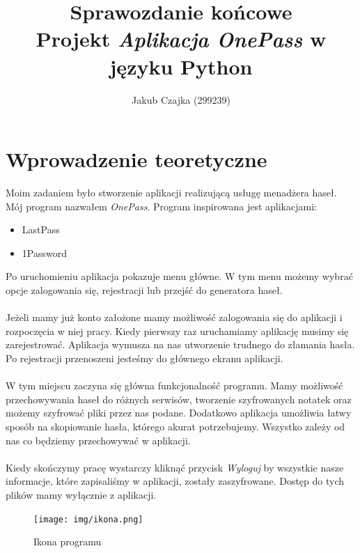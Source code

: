 \documentclass[a4paper]{article}
\title{Sprawozdanie końcowe \\ Projekt \textit{Aplikacja OnePass} w języku Python}
\author{Jakub Czajka (299239)}
\begin{document}
\maketitle
\tableofcontents
\thispagestyle{empty}
\newpage

\section{Wprowadzenie teoretyczne}
Moim zadaniem było stworzenie aplikacji realizującą usługę menadżera haseł. Mój program nazwałem \textit{OnePass}. Program inspirowana jest aplikacjami:
\begin{itemize}
    \item LastPass
    \item 1Password
\end{itemize}
Po uruchomieniu aplikacja pokazuje menu główne. W tym menu możemy wybrać opcje zalogowania się, rejestracji lub przejść do generatora haseł.\\ \\
Jeżeli mamy już konto założone mamy możliwość zalogowania się do aplikacji i rozpoczęcia w niej pracy. Kiedy pierwszy raz uruchamiamy aplikację musimy się zarejestrować. Aplikacja wymusza na nas utworzenie trudnego do złamania hasła. Po rejestracji przenoszeni jesteśmy do głównego ekranu aplikacji.\\ \\
W tym miejscu zaczyna się główna funkcjonalność programu. Mamy możliwość przechowywania haseł do różnych serwisów, tworzenie szyfrowanych notatek oraz możemy szyfrować pliki przez nas podane. Dodatkowo aplikacja umożliwia łatwy sposób na skopiowanie hasła, którego akurat potrzebujemy. Wszystko zależy od nas co będziemy przechowywać w aplikacji.\\ \\
Kiedy skończymy pracę wystarczy kliknąć przycisk \textit{Wyloguj} by wszystkie nasze informacje, które zapisaliśmy w aplikacji, zostały zaszyfrowane. Dostęp do tych plików mamy wyłącznie z aplikacji.
\\
\begin{figure}[H]
    \centering
    \texttt{[image: img/ikona.png]}
    \caption{Ikona programu}
    \label{fig:ikona}
\end{figure}
\end{document}
